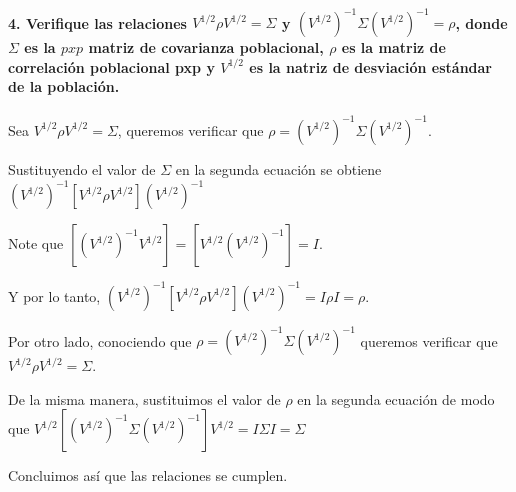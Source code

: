 \documentclass[
]{article}
\begin{document}
\hypertarget{verifique-las-relaciones-v12rho-v12-sigma-y-v12-1-sigma-v12-1-rho-donde-sigma-es-la-pxp-matriz-de-covarianza-poblacional-rho-es-la-matriz-de-correlaciuxf3n-poblacional-pxp-y-v12-es-la-natriz-de-desviaciuxf3n-estuxe1ndar-de-la-poblaciuxf3n.}{%
\paragraph{\texorpdfstring{4. Verifique las relaciones
\(V^{1/2}\rho V^{1/2} = \Sigma\) y
\((V^{1/2})^{-1} \Sigma (V^{1/2})^{-1} = \rho\), donde \(\Sigma\) es la
\(pxp\) matriz de covarianza poblacional, \(\rho\) es la matriz de
correlación poblacional pxp y \(V^{1/2}\) es la natriz de desviación
estándar de la
población.}{4. Verifique las relaciones V\^{}\{1/2\}\textbackslash rho V\^{}\{1/2\} = \textbackslash Sigma y (V\^{}\{1/2\})\^{}\{-1\} \textbackslash Sigma (V\^{}\{1/2\})\^{}\{-1\} = \textbackslash rho, donde \textbackslash Sigma es la pxp matriz de covarianza poblacional, \textbackslash rho es la matriz de correlación poblacional pxp y V\^{}\{1/2\} es la natriz de desviación estándar de la población.}}\label{verifique-las-relaciones-v12rho-v12-sigma-y-v12-1-sigma-v12-1-rho-donde-sigma-es-la-pxp-matriz-de-covarianza-poblacional-rho-es-la-matriz-de-correlaciuxf3n-poblacional-pxp-y-v12-es-la-natriz-de-desviaciuxf3n-estuxe1ndar-de-la-poblaciuxf3n.}}

Sea \(V^{1/2}\rho V^{1/2} = \Sigma\), queremos verificar que
\(\rho = (V^{1/2})^{-1} \Sigma (V^{1/2})^{-1}\).

Sustituyendo el valor de \(\Sigma\) en la segunda ecuación se obtiene
\((V^{1/2})^{-1} [V^{1/2}\rho V^{1/2}] (V^{1/2})^{-1}\)

Note que \([(V^{1/2})^{-1} V^{1/2}] = [V^{1/2} (V^{1/2})^{-1}] = I\).

Y por lo tanto,
\((V^{1/2})^{-1} [V^{1/2}\rho V^{1/2}] (V^{1/2})^{-1} = I \rho I = \rho\).

Por otro lado, conociendo que
\(\rho = (V^{1/2})^{-1} \Sigma (V^{1/2})^{-1}\) queremos verificar que
\(V^{1/2}\rho V^{1/2} = \Sigma\).

De la misma manera, sustituimos el valor de \(\rho\) en la segunda
ecuación de modo que
\(V^{1/2}[(V^{1/2})^{-1} \Sigma (V^{1/2})^{-1}]V^{1/2} = I \Sigma I = \Sigma\)

Concluimos así que las relaciones se cumplen.
\end{document}
